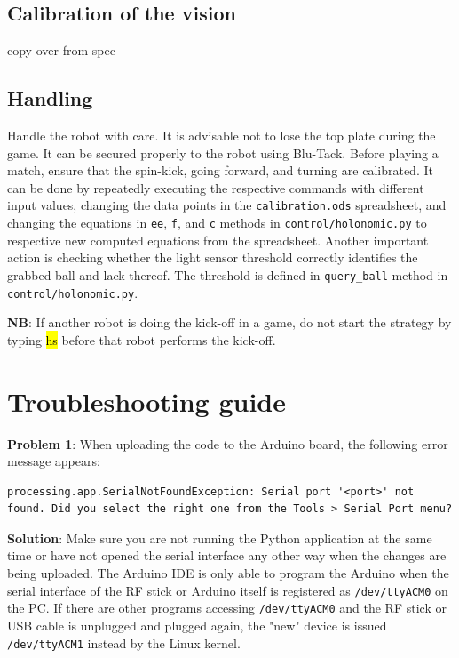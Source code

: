 \documentclass[a4paper,12pt]{article}
\newcommand{\hg}[1]{\hl{\ttfamily #1}}
\begin{document}
\subsection{Calibration of the vision} \label{calibration}

copy over from spec

\subsection{Handling} \label{handling}

Handle the robot with care. It is advisable not to lose the top plate during the game. It can be secured properly to the robot using Blu-Tack. Before playing a match, ensure that the spin-kick, going forward, and turning are calibrated. It can be done by repeatedly executing the respective commands with different input values, changing the data points in the \texttt{calibration.ods} spreadsheet, and changing the equations in \texttt{ee}, \texttt{f}, and \texttt{c} methods in \texttt{control/holonomic.py} to respective new computed equations from the spreadsheet. Another important action is checking whether the light sensor threshold correctly identifies the grabbed ball and lack thereof. The threshold is defined in \texttt{query\_ball} method in \texttt{control/holonomic.py}.

\textbf{NB}: If another robot is doing the kick-off in a game, do not start the strategy by typing \hg{hs} before that robot performs the kick-off.

\section{Troubleshooting guide}

\textbf{Problem 1}: When uploading the code to the Arduino board, the following error message appears:
\begin{lstlisting}
processing.app.SerialNotFoundException: Serial port '<port>' not found. Did you select the right one from the Tools > Serial Port menu?
\end{lstlisting}

\textbf{Solution}: Make sure you are not running the Python application at the same time or have not opened the serial interface any other way when the changes are being uploaded. The Arduino IDE is only able to program the Arduino when the serial interface of the RF stick or Arduino itself is registered as \texttt{/dev/ttyACM0} on the PC. If there are other programs accessing \texttt{/dev/ttyACM0} and the RF stick or USB cable is unplugged and plugged again, the "new" device is issued \texttt{/dev/ttyACM1} instead by the Linux kernel.
\end{document}
